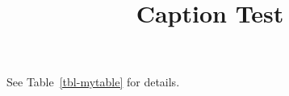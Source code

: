 \documentclass[
  letterpaper,
  DIV=11,
  numbers=noendperiod]{scrartcl}
\title{Caption Test}
\author{}
\date{}
\begin{document}
\maketitle


See Table~\ref{tbl-mytable} for details.

\begin{table}

\caption{\label{tbl-mytable}My raw latex table}


\end{table}%
\end{document}
